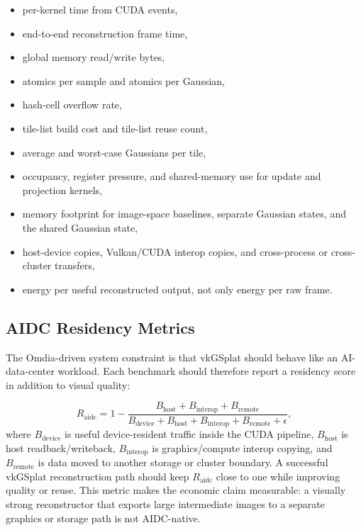 \documentclass[11pt]{article}
\begin{document}
\begin{itemize}
  \item per-kernel time from CUDA events,
  \item end-to-end reconstruction frame time,
  \item global memory read/write bytes,
  \item atomics per sample and atomics per Gaussian,
  \item hash-cell overflow rate,
  \item tile-list build cost and tile-list reuse count,
  \item average and worst-case Gaussians per tile,
  \item occupancy, register pressure, and shared-memory use for update and
        projection kernels,
  \item memory footprint for image-space baselines, separate Gaussian states,
        and the shared Gaussian state,
  \item host-device copies, Vulkan/CUDA interop copies, and cross-process or
        cross-cluster transfers,
  \item energy per useful reconstructed output, not only energy per raw frame.
\end{itemize}

\subsection{AIDC Residency Metrics}

The Omdia-driven system constraint is that vkGSplat should behave like an
AI-data-center workload. Each benchmark should therefore report a residency
score in addition to visual quality:

\[
  R_{\mathrm{aidc}} =
  1 -
  \frac{
    B_{\mathrm{host}} + B_{\mathrm{interop}} + B_{\mathrm{remote}}
  }{
    B_{\mathrm{device}} + B_{\mathrm{host}} + B_{\mathrm{interop}}
    + B_{\mathrm{remote}} + \epsilon
  },
\]
where $B_{\mathrm{device}}$ is useful device-resident traffic inside the CUDA
pipeline, $B_{\mathrm{host}}$ is host readback/writeback, $B_{\mathrm{interop}}$
is graphics/compute interop copying, and $B_{\mathrm{remote}}$ is data moved to
another storage or cluster boundary. A successful vkGSplat reconstruction path
should keep $R_{\mathrm{aidc}}$ close to one while improving quality or reuse.
This metric makes the economic claim measurable: a visually strong
reconstructor that exports large intermediate images to a separate graphics or
storage path is not AIDC-native.
\end{document}
